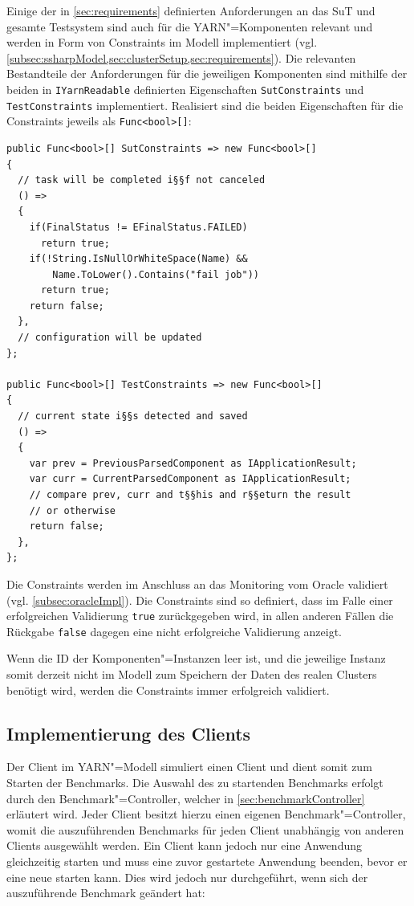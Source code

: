 Einige der in \cref{sec:requirements} definierten Anforderungen an das \gls{SuT} und gesamte Testsystem sind auch für die YARN"=Komponenten relevant und werden in Form von Constraints im Modell implementiert (vgl. \cref{subsec:ssharpModel,sec:clusterSetup,sec:requirements}).
Die relevanten Bestandteile der Anforderungen für die jeweiligen Komponenten sind mithilfe der beiden in \texttt{IYarnReadable} definierten Eigenschaften \texttt{SutConstraints} und \texttt{TestConstraints} implementiert.
Realisiert sind die beiden Eigenschaften für die Constraints jeweils als \texttt{Func<bool>[]}:

\begin{lstlisting}[label=lst:constraintDefinition,style=cs,
caption={[Definition der Constraints in YarnApp]
    Definition der Constraints in \texttt{YarnApp} (gekürzt)}]
public Func<bool>[] SutConstraints => new Func<bool>[]
{
  // task will be completed i§§f not canceled
  () =>
  {
    if(FinalStatus != EFinalStatus.FAILED)
      return true;
    if(!String.IsNullOrWhiteSpace(Name) &&
        Name.ToLower().Contains("fail job"))
      return true;
    return false;
  },
  // configuration will be updated
};

public Func<bool>[] TestConstraints => new Func<bool>[]
{
  // current state i§§s detected and saved
  () =>
  {
    var prev = PreviousParsedComponent as IApplicationResult;
    var curr = CurrentParsedComponent as IApplicationResult;
    // compare prev, curr and t§§his and r§§eturn the result
    // or otherwise
    return false;
  },
};
\end{lstlisting}

Die Constraints werden im Anschluss an das Monitoring vom Oracle validiert (vgl. \cref{subsec:oracleImpl}).
Die Constraints sind so definiert, dass im Falle einer erfolgreichen Validierung \texttt{true} zurückgegeben wird, in allen anderen Fällen die Rückgabe \texttt{false} dagegen eine nicht erfolgreiche Validierung anzeigt.

Wenn die ID der Komponenten"=Instanzen leer ist, und die jeweilige Instanz somit derzeit nicht im Modell zum Speichern der Daten des realen Clusters benötigt wird, werden die Constraints immer erfolgreich validiert.

\subsection{Implementierung des Clients}
\label{subsec:yarnClient}

Der Client im YARN"=Modell simuliert einen Client und dient somit zum Starten der Benchmarks.
Die Auswahl des zu startenden Benchmarks erfolgt durch den Benchmark"=Controller, welcher in \cref{sec:benchmarkController} erläutert wird.
Jeder Client besitzt hierzu einen eigenen Benchmark"=Controller, womit die auszuführenden Benchmarks für jeden Client unabhängig von anderen Clients ausgewählt werden.
Ein Client kann jedoch nur eine Anwendung gleichzeitig starten und muss eine zuvor gestartete Anwendung beenden, bevor er eine neue starten kann.
Dies wird jedoch nur durchgeführt, wenn sich der auszuführende Benchmark geändert hat:

